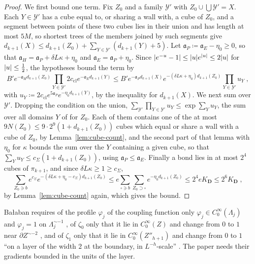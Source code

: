 \documentclass[11pt]{preprint}
\DeclarePairedDelimiter{\abs}{\lvert}{\rvert}
\numberwithin{equation}{section}
\theoremstyle{definition}
\theoremstyle{remark}
\theoremstyle{plain}
\begin{document}
\begin{proof}
We first bound one term. Fix $Z_0$ and a family $\mathcal Y'$ with $Z_0 \cup \bigcup\mathcal Y' = X$. Each $Y \in \mathcal Y'$ has a cube equal to, or sharing a wall with, a cube of $Z_0$, and a segment between points of these two cubes lies in their union and has length at most $5M$, so shortest trees of the members joined by such segments give $d_{k+1}(X) \leq d_{k+1}(Z_0) + \sum_{Y \in \mathcal Y'}(d_{k+1}(Y) + 5)$. Let $\mathfrak a_P \coloneqq \mathfrak a_E - \eta_0 \geq 0$, so that $\mathfrak a_H = \mathfrak a_P + \delta L\kappa + \eta_0$ and $\mathfrak a_E = \mathfrak a_P + \eta_0$. Since $\abs{e^{-u} - 1} \leq \abs ue^{\abs u} \leq 2\abs u$ for $\abs u \leq \frac12$, the hypotheses bound the term by
\begin{equation*}
    B'e^{-\mathfrak a_Hd_{k+1}(Z_0)}\prod_{Y \in \mathcal Y'}2c_{\mathrm{cl}}e^{-\mathfrak a_Ed_{k+1}(Y)} \leq B'e^{-\mathfrak a_Pd_{k+1}(X)}e^{-(\delta L\kappa + \eta_0)d_{k+1}(Z_0)}\prod_{Y \in \mathcal Y'}u_Y\;,
\end{equation*}
with $u_Y \coloneqq 2c_{\mathrm{cl}}e^{5\mathfrak a_P}e^{-\eta_0d_{k+1}(Y)}$, by the inequality for $d_{k+1}(X)$. We next sum over $\mathcal Y'$. Dropping the condition on the union, $\sum_{\mathcal Y'}\prod_{Y \in \mathcal Y'}u_Y \leq \exp\sum_Yu_Y$, the sum over all domains $Y$ of \cite[(3.46)]{BalabanCRE} for $Z_0$. Each of them contains one of the at most $9N(Z_0) \leq 9 \cdot 2^9(1 + d_{k+1}(Z_0))$ cubes which equal or share a wall with a cube of $Z_0$, by Lemma~\ref{lem:cube-count}, and the second part of that lemma with $\eta_0$ for $\kappa$ bounds the sum over the $Y$ containing a given cube, so that $\sum_Yu_Y \leq c_\Sigma(1 + d_{k+1}(Z_0))$, using $\mathfrak a_P \leq \mathfrak a_E$. Finally a bond lies in at most $2^4$ cubes of $\pi_{k+1}$, and since $\delta L\kappa \geq 1 \geq c_\Sigma$,
\begin{equation*}
    \sum_{Z_0 \ni b}e^{c_\Sigma}e^{-(\delta L\kappa + \eta_0 - c_\Sigma)d_{k+1}(Z_0)} \leq e\sum_{\square \ni b}\sum_{Z_0 \supset \square}e^{-\eta_0d_{k+1}(Z_0)} \leq 2^4eK_{\mathbf D} \leq 2^6K_{\mathbf D}\;,
\end{equation*}
by Lemma~\ref{lem:cube-count} again, which gives the bound.
\end{proof}

Ba{\l}aban requires of the profile $\varphi_j$ of the coupling function \cite[(2.24)]{BalabanCRE} only $\varphi_j \in C_0^\infty(\Lambda_j)$ and $\varphi_j = 1$ on $\Lambda_j^{\sim-1}$ \cite[p.~259, ll.~20--21]{BalabanCRE}, of $\zeta_0$ \cite[(1.100)]{BalabanLFR1} only that it lie in $C_0^\infty(Z)$ and change from $0$ to $1$ near $\partial Z^{\sim-2}$ \cite[p.~201, ll.~28--29]{BalabanLFR1}, and of $\zeta_1$ \cite[(1.70)]{BalabanLFR2} only that it lie in $C_0^\infty(Z''_{h+1})$ and change from $0$ to $1$ ``on a layer of the width $2$ at the boundary, in $L^{-h}$-scale'' \cite[p.~360, ll.~34--35]{BalabanLFR2}. The paper needs their gradients bounded in the units of the layer.
\end{document}
